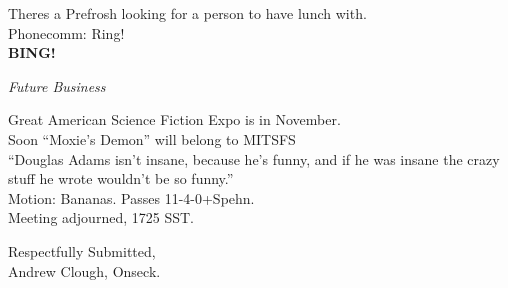 \documentclass{article}
\begin{document}
Theres a Prefrosh looking for a person to have lunch with.\\

Phonecomm: Ring!\\

\textbf{BING!}
\begin{center}
\textit{Future Business}
\end{center}

Great American Science Fiction Expo is in November.\\

Soon ``Moxie's Demon'' will belong to MITSFS\\

``Douglas Adams isn't insane, because he's funny, and if he was insane the crazy stuff he wrote wouldn't be so funny.''\\

Motion:  Bananas.  Passes 11-4-0+Spehn.\\

Meeting adjourned, 1725 SST.\\

\begin{center}
Respectfully Submitted,\\
Andrew Clough, Onseck.
\end{center}
\end{document}
